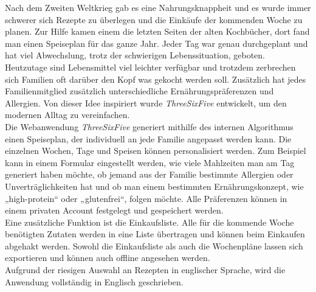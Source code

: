 Nach dem Zweiten Weltkrieg gab es eine Nahrungsknappheit und es wurde immer schwerer sich Rezepte zu überlegen und die Einkäufe der kommenden Woche zu planen. Zur Hilfe kamen einem die letzten Seiten der alten Kochbücher, dort fand man einen Speiseplan für das ganze Jahr. Jeder Tag war genau durchgeplant und hat viel Abwechslung, trotz der schwierigen Lebenssituation, geboten.\\

Heutzutage sind Lebensmittel viel leichter verfügbar und trotzdem zerbrechen sich Familien oft darüber den Kopf was gekocht werden soll. Zusätzlich hat jedes Familienmitglied zusätzlich unterschiedliche Ernährungspräferenzen und Allergien. Von dieser Idee inspiriert wurde \textit{ThreeSixFive} entwickelt, um den modernen Alltag zu vereinfachen.\\



Die Webanwendung \textit{ThreeSixFive} generiert mithilfe des internen Algorithmus einen Speiseplan, der individuell an jede Familie angepasst werden kann. Die einzelnen Wochen, Tage und Speisen können personalisiert werden. Zum Beispiel kann in einem Formular eingestellt werden, wie viele Mahlzeiten man am Tag generiert haben möchte, ob jemand aus der Familie bestimmte Allergien oder Unverträglichkeiten hat und ob man einem bestimmten Ernährungskonzept, wie „high-protein“ oder „glutenfrei“, folgen möchte. Alle Präferenzen können in einem privaten Account festgelegt und gespeichert werden.\\
Eine zusätzliche Funktion ist die Einkaufsliste. Alle für die kommende Woche benötigten Zutaten werden in eine Liste übertragen und können beim Einkaufen abgehakt werden. Sowohl die Einkaufsliste als auch die Wochenpläne lassen sich exportieren und können auch offline angesehen werden. \\
Aufgrund der riesigen Auswahl an Rezepten in englischer Sprache, wird die Anwendung vollständig in Englisch geschrieben. 
